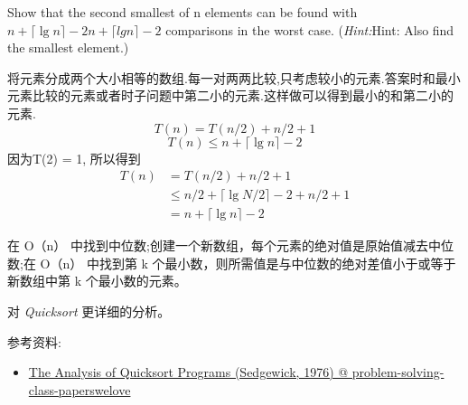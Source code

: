 \documentclass[a4paper, justified]{tufte-handout}
\begin{document}
\begin{problem}[TC 9.1-1]
Show that the second smallest of n elements can be found with $n + \lceil \lg n \rceil - 2n+⌈lgn⌉−2$ comparisons in the worst case. (\textit{Hint:}Hint: Also find the smallest element.)
\end{problem}

\begin{solution}
  将元素分成两个大小相等的数组.每一对两两比较,只考虑较小的元素.答案时和最小元素比较的元素或者时子问题中第二小的元素.这样做可以得到最小的和第二小的元素.\\
  $$T(n) = T(n/2) + n/2 +1$$
  $$T(n) \leq n + \lceil \lg n\rceil -2$$
  因为T(2) = 1, 所以得到
  $$
    \begin{aligned}
      T(n) & = T(n/2)+ n/2 +1                               \\
           & \leq  n/2 + \lceil \lg {N/2}\rceil -2 + n/2 +1 \\
           & =n+\lceil \lg n\rceil-2
    \end{aligned}
  $$
\end{solution}

\begin{problem}[TC 9.3-7]
\end{problem}

\begin{solution}
  在 O（n） 中找到中位数;创建一个新数组，每个元素的绝对值是原始值减去中位数;在 O（n） 中找到第 k 个最小数，则所需值是与中位数的绝对差值小于或等于新数组中第 k 个最小数的元素。
\end{solution}

\beginoptional

\begin{problem}[TC Problem 7-5]
\end{problem}

\begin{solution}
\end{solution}

\beginot

\begin{ot}

  对 \textsl{Quicksort} 更详细的分析。

  \noindent 参考资料:
  \begin{itemize}
    \item \href{https://github.com/hengxin/problem-solving-class-paperswelove/blob/master/2nd-semester/The\%20Analysis\%20of\%20Quicksort\%20Programs\%20(Sedgewick\%2C\%201976).pdf}{The Analysis of Quicksort Programs (Sedgewick, 1976) @ problem-solving-class-paperswelove}
  \end{itemize}
\end{ot}
\end{document}
